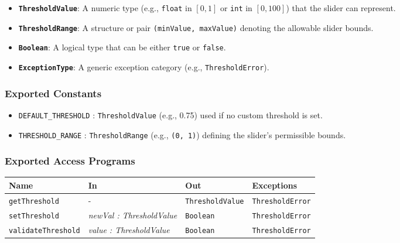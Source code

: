 \documentclass[12pt, titlepage]{article}
\begin{document}
\begin{itemize}
    \item \textbf{\texttt{ThresholdValue}}: A numeric type (e.g., \texttt{float} in $[0,1]$ or \texttt{int} in $[0,100]$) that the slider can represent.
    \item \textbf{\texttt{ThresholdRange}}: A structure or pair \texttt{(minValue, maxValue)} denoting the allowable slider bounds.
    \item \textbf{\texttt{Boolean}}: A logical type that can be either \texttt{true} or \texttt{false}.
    \item \textbf{\texttt{ExceptionType}}: A generic exception category (e.g., \texttt{ThresholdError}).
\end{itemize}

\subsubsection{Exported Constants}

\begin{itemize}
    \item \texttt{DEFAULT\_THRESHOLD} : \texttt{ThresholdValue} (e.g., 0.75) used if no custom threshold is set.
    \item \texttt{THRESHOLD\_RANGE} : \texttt{ThresholdRange} (e.g., \texttt{(0, 1)}) defining the slider’s permissible bounds.
\end{itemize}

\subsubsection{Exported Access Programs}

\begin{center}
\begin{tabular}{p{3.5cm} p{3.8cm} p{3cm} p{2.5cm}}
\hline
\textbf{Name} & \textbf{In} & \textbf{Out} & \textbf{Exceptions} \\
\hline
\texttt{getThreshold} 
  & - 
  & \texttt{ThresholdValue} 
  & \texttt{ThresholdError} \\

\texttt{setThreshold} 
  & \textit{newVal : ThresholdValue}
  & \texttt{Boolean}
  & \texttt{ThresholdError} \\

\texttt{validateThreshold} 
  & \textit{value : ThresholdValue}
  & \texttt{Boolean} 
  & \texttt{ThresholdError} \\
\hline
\end{tabular}
\end{center}
\end{document}
